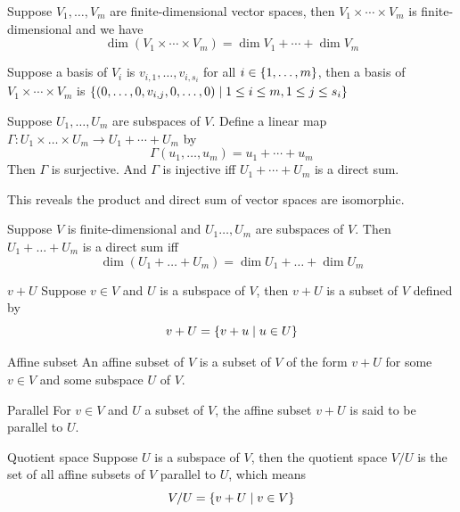 \documentclass[12pt,a4paper]{article}
\begin{document}
    \begin{prop}
        Suppose $V_1,\dots,V_m$ are finite-dimensional vector spaces, then $V_1\times\cdots\times V_m$ is finite-dimensional and we have
        $$\dim(V_1\times\cdots\times V_m)=\dim V_1+\cdots+\dim V_m$$
    \end{prop}
    \begin{remark}
        Suppose a basis of $V_i$ is $v_{i,1},\dots,v_{i,s_i}$ for all $i\in\left\{1,\dots,m\right\}$, then a basis of $V_1\times\cdots\times V_m$ is $\left\{(0,\dots,0,v_{i,j},0,\dots,0)\mid 1\leq i\leq m,1\leq j\leq s_i\right\}$ 
    \end{remark}
    \hfill

    \begin{prop}
        Suppose $U_1,\dots,U_m$ are subspaces of $V$. Define a linear map $\Gamma:U_1\times\dots\times U_m\to U_1+\cdots+U_m$ by
        $$
        \Gamma(u_1,\dots,u_m)=u_1+\cdots+u_m
        $$
        Then $\Gamma$ is surjective. And $\Gamma$ is injective iff $U_1+\cdots+U_m$ is a direct sum.
    \end{prop}
    \begin{remark}
        This reveals the product and direct sum of vector spaces are isomorphic.
    \end{remark}
    \begin{cor}
        Suppose $V$ is finite-dimensional and $U_1\dots,U_m$ are subspaces of $V$. Then $U_1+\dots+U_m$ is a direct sum iff 
        $$
        \dim(U_1+\dots+U_m)=\dim U_1+\dots+\dim U_m
        $$
    \end{cor}
    \hfill

    \begin{defi}{$v+U$}
        Suppose $v\in V$ and $U$ is a subspace of $V$, then $v+U$ is a subset of $V$ defined by
    $$
    v+U=\left\{v+u\mid u\in U\right\}
    $$
    \end{defi}

    \begin{defi}{Affine subset}
        An affine subset of $V$ is a subset of $V$ of the form $v+U$ for some $v\in V$ and some subspace $U$ of $V$.
    \end{defi}
    \begin{defi}{Parallel}
        For $v\in V$ and $U$ a subset of $V$, the affine subset $v+U$ is said to be parallel to $U$.
    \end{defi}
    \hfill

    \begin{defi}{Quotient space}
        Suppose $U$ is a subspace of $V$, then the quotient space $V/U$ is the set of all affine subsets of $V$ parallel to $U$, which means
        $$
        V/U=\left\{v+U\mid v\in V\right\}
        $$
    \end{defi}
    \hfill
\end{document}
